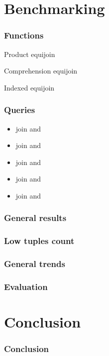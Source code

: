 \documentclass{beamer}
\begin{document}
\section{Benchmarking}
\begin{frame}
\frametitle{Functions}
\begin{block}{Product equijoin}
    \vspace{-4mm}
    {\scriptsize}
    \vspace{-7mm}
\end{block}\pause
\begin{block}{Comprehension equijoin}
    \vspace{-4mm}
    {\scriptsize}
    \vspace{-7mm}
\end{block}\pause
\begin{block}{Indexed equijoin}
    \vspace{-4mm}
    {\scriptsize}
    \vspace{-7mm}
\end{block}
\end{frame}
\begin{frame}
\frametitle{Queries}
\begin{itemize}
    \item {\large join  and
        }
        \vspace{1.5mm}\pause
    \item {\large join  and
        }
        \vspace{1.5mm}\pause
    \item {\large join  and
        }
        \vspace{1.5mm}\pause
    \item {\large join  and
        }
        \vspace{1.5mm}\pause
    \item {\large join  and
        }
\end{itemize}
\end{frame}

\begin{frame}
\frametitle{General results}
\end{frame}

\begin{frame}
\frametitle{Low tuples count}
\end{frame}

\begin{frame}
\frametitle{General trends}
\end{frame}

\begin{frame}
\frametitle{Evaluation}
\end{frame}

\section{Conclusion}
\begin{frame}
\frametitle{Conclusion}
\end{frame}
\end{document}
